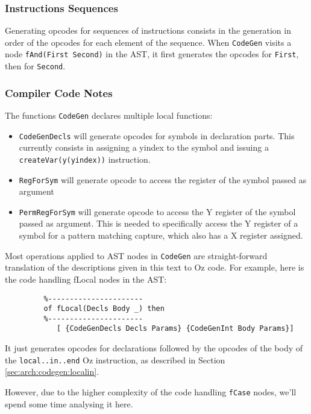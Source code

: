 \documentclass[a4paper]{memoir}
\begin{document}
\subsubsection{Instructions Sequences}
Generating opcodes for sequences of instructions consists in the generation in order of the opcodes for each element of the sequence. 
When \lstinline!CodeGen! visits a node \lstinline!fAnd(First Second)! in the AST, it first generates the opcodes for \lstinline!First!, then for \lstinline!Second!.


\subsubsection{Compiler Code Notes}
The functions \lstinline!CodeGen! declares multiple local functions:
\begin{itemize}
  \item \lstinline!CodeGenDecls! will generate opcodes for symbols in
    declaration parts. This currently consists in assigning a yindex to the
    symbol and issuing a \lstinline!createVar(y(yindex))! instruction.
  \item \lstinline!RegForSym! will generate opcode to access the register of the
    symbol passed as argument
  \item \lstinline!PermRegForSym! will generate opcode to access the Y register
    of the symbol passed as argument. This is needed to specifically access the
    Y register of a symbol for a pattern matching capture, which also has a X
    register assigned.
\end{itemize}

Most operations applied to AST nodes in \lstinline!CodeGen! are straight-forward translation of the
descriptions given in this text to Oz code. For example, here is the
code handling fLocal nodes in the AST:

\begin{lstlisting}
         %----------------------
         of fLocal(Decls Body _) then
         %----------------------
            [ {CodeGenDecls Decls Params} {CodeGenInt Body Params}]
\end{lstlisting}

It just generates opcodes for declarations followed by the opcodes of the body
of the \lstinline!local..in..end! Oz instruction, as described in Section
\ref{sec:arch:codegen:localin}.

However, due to the higher complexity of the code handling \lstinline!fCase! nodes, we'll
spend some time analysing it here.
\end{document}
